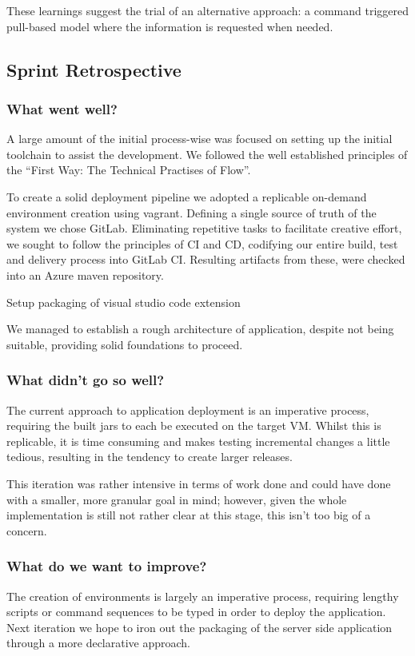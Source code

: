 These learnings suggest the trial of an alternative approach: a command triggered pull-based model where the information is requested when needed.

\subsection{Sprint Retrospective}

\subsubsection{What went well?}

A large amount of the initial process-wise was focused on setting up the initial toolchain to assist the development. We followed the well established principles of the ``First Way: The Technical Practises of Flow''.


To create a solid deployment pipeline we adopted a replicable on-demand environment creation using vagrant. Defining a single source of truth of the system we chose GitLab. Eliminating repetitive tasks to facilitate creative effort, we sought to follow the principles of CI and CD, codifying our entire build, test and delivery process into GitLab CI. Resulting artifacts from these, were checked into an Azure maven repository.

Setup packaging of visual studio code extension

We managed to establish a rough architecture of application, despite not being suitable, providing solid foundations to proceed.

\subsubsection{What didn't go so well?}

The current approach to application deployment is an imperative process, requiring the built jars to each be executed on the target VM. Whilst this is replicable, it is time consuming and makes testing incremental changes a little tedious, resulting in the tendency to create larger releases.

This iteration was rather intensive in terms of work done and could have done with a smaller, more granular goal in mind; however, given the whole implementation is still not rather clear at this stage, this isn't too big of a concern.

\subsubsection{What do we want to improve?}

The creation of environments is largely an imperative process, requiring lengthy scripts or command sequences to be typed in order to deploy the application. Next iteration we hope to iron out the packaging of the server side application through a more declarative approach. 